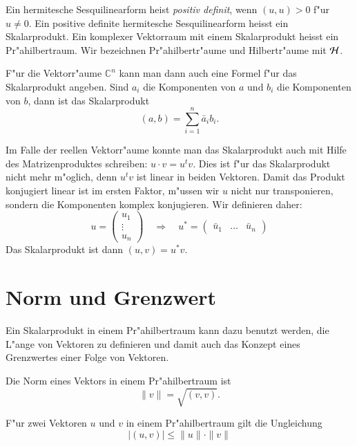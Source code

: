 \begin{definition}
Ein hermitesche Sesquilinearform heist {\em positiv definit}, wenn
$(u,u)>0$ f"ur $u\ne 0$. Ein positive definite hermitesche Sesquilinearform
heisst ein Skalarprodukt. Ein komplexer Vektorraum mit einem Skalarprodukt
heisst ein Pr"ahilbertraum.
Wir bezeichnen Pr"ahilbertr"aume und Hilbertr"aume mit ${\cal H}$.
\end{definition}


F"ur die Vektorr"aume $\mathbb C^n$ kann man dann auch eine Formel
f"ur das Skalarprodukt angeben. Sind $a_i$ die Komponenten von $a$ und
$b_i$ die Komponenten von $b$, dann ist das Skalarprodukt
\[
(a,b)=\sum_{i=1}^n \bar a_ib_i.
\]

Im Falle der reellen Vektorr"aume konnte man das Skalarprodukt
auch mit Hilfe des Matrizenproduktes schreiben: $u\cdot v=u^tv$.
Dies ist f"ur das Skalarprodukt nicht mehr m"oglich, denn $u^tv$
ist linear in beiden Vektoren.
Damit das Produkt konjugiert linear ist im ersten Faktor, m"ussen
wir $u$ nicht nur transponieren, sondern die Komponenten komplex konjugieren.
Wir definieren daher:
\[
u=\begin{pmatrix}u_1\\\vdots\\u_n\end{pmatrix}
\quad\Rightarrow\quad
u^*=\begin{pmatrix}\bar u_1&\dots&\bar u_n\end{pmatrix}
\]
Das Skalarprodukt ist dann $(u,v)=u^*v$.

\section{Norm und Grenzwert}
Ein Skalarprodukt in einem Pr"ahilbertraum kann dazu benutzt werden,
die L"ange von Vektoren zu definieren und damit auch das Konzept eines
Grenzwertes einer Folge von Vektoren.

\begin{definition}
Die Norm eines Vektors in einem Pr"ahilbertraum ist
\[
\| v\| = \sqrt{(v,v)}.
\]
\end{definition}

\begin{satz} F"ur zwei Vektoren $u$ und $v$
in einem Pr"ahilbertraum gilt die Ungleichung
\[
|(u,v)| \le \| u\|\cdot \| v\|
\]
\end{satz}

